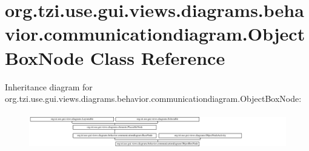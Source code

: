 \hypertarget{classorg_1_1tzi_1_1use_1_1gui_1_1views_1_1diagrams_1_1behavior_1_1communicationdiagram_1_1_object_box_node}{\section{org.\-tzi.\-use.\-gui.\-views.\-diagrams.\-behavior.\-communicationdiagram.\-Object\-Box\-Node Class Reference}
\label{classorg_1_1tzi_1_1use_1_1gui_1_1views_1_1diagrams_1_1behavior_1_1communicationdiagram_1_1_object_box_node}
}
Inheritance diagram for org.\-tzi.\-use.\-gui.\-views.\-diagrams.\-behavior.\-communicationdiagram.\-Object\-Box\-Node\-:\begin{figure}[H]
\begin{center}
\leavevmode
\includegraphics[height=1.592040cm]{classorg_1_1tzi_1_1use_1_1gui_1_1views_1_1diagrams_1_1behavior_1_1communicationdiagram_1_1_object_box_node}
\end{center}
\end{figure}
